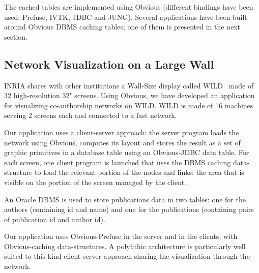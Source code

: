The cached tables are implemented using Obvious (different bindings
have been used: Prefuse, IVTK, JDBC and JUNG). Several applications have
been built around Obvious DBMS caching tables; one of them is
presented in the next section.

\subsection{Network Visualization on a Large Wall}

INRIA shares with other institutions a Wall-Size display called
WILD~\cite{Wild} made of 32 high-resolution 32" screens.  Using
Obvious, we have developed an application for visualizing
co-authorship networks on WILD.  WILD is made of 16 machines serving 2
screens each and connected to a fast network.

Our application uses a client-server approach: the server program
loads the network using Obvious, computes its layout and stores the
result as a set of graphic primitives in a database table using an
Obvious-JDBC data table.  For each screen, one client program is
launched that uses the DBMS caching data-structure to load the
relevant portion of the nodes and links: the area that is visible on
the portion of the screen managed by the client.

An Oracle DBMS is used to store publications data in two tables: one
for the authors (containing id and name) and one for the publications
(containing pairs of publication id and author id).

Our application uses Obvious-Prefuse in the server and in the clients,
with Obvious-caching data-structures.  A polylithic architecture is
particularly well suited to this kind client-server approach sharing
the visualization through the network.


